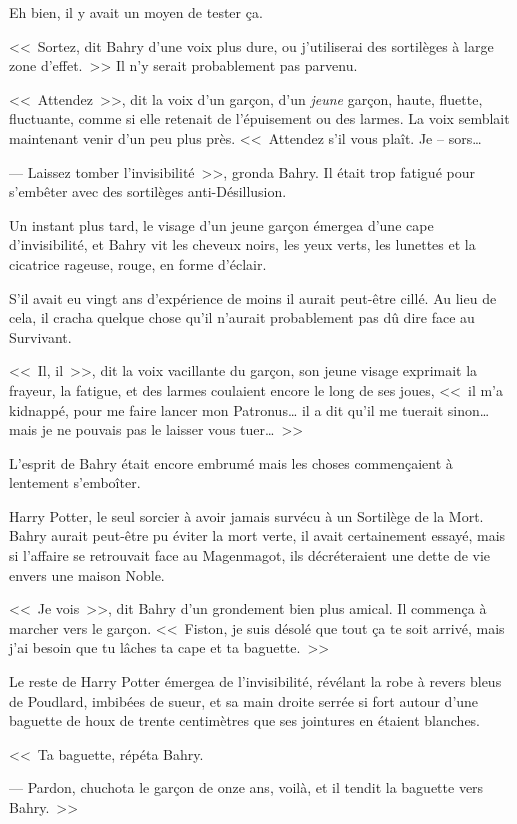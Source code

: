 Eh bien, il y avait un moyen de tester ça.

<<~Sortez, dit Bahry d'une voix plus dure, ou j'utiliserai des sortilèges à large zone d'effet.~>> Il n'y serait probablement pas parvenu.

<<~Attendez~>>, dit la voix d'un garçon, d'un \emph{jeune} garçon, haute, fluette, fluctuante, comme si elle retenait de l'épuisement ou des larmes. La voix semblait maintenant venir d'un peu plus près. <<~Attendez s'il vous plaît. Je -- sors…

--- Laissez tomber l'invisibilité~>>, gronda Bahry. Il était trop fatigué pour s'embêter avec des sortilèges anti-Désillusion.

Un instant plus tard, le visage d'un jeune garçon émergea d'une cape d'invisibilité, et Bahry vit les cheveux noirs, les yeux verts, les lunettes et la cicatrice rageuse, rouge, en forme d'éclair.

S'il avait eu vingt ans d'expérience de moins il aurait peut-être cillé. Au lieu de cela, il cracha quelque chose qu'il n'aurait probablement pas dû dire face au Survivant.

<<~Il, il~>>, dit la voix vacillante du garçon, son jeune visage exprimait la frayeur, la fatigue, et des larmes coulaient encore le long de ses joues, <<~il m'a kidnappé, pour me faire lancer mon Patronus… il a dit qu'il me tuerait sinon… mais je ne pouvais pas le laisser vous tuer…~>>

L'esprit de Bahry était encore embrumé mais les choses commençaient à lentement s'emboîter.

Harry Potter, le seul sorcier à avoir jamais survécu à un Sortilège de la Mort. Bahry aurait peut-être pu éviter la mort verte, il avait certainement essayé, mais si l'affaire se retrouvait face au Magenmagot, ils décréteraient une dette de vie envers une maison Noble.

<<~Je vois~>>, dit Bahry d'un grondement bien plus amical. Il commença à marcher vers le garçon. <<~Fiston, je suis désolé que tout ça te soit arrivé, mais j'ai besoin que tu lâches ta cape et ta baguette.~>>

Le reste de Harry Potter émergea de l'invisibilité, révélant la robe à revers bleus de Poudlard, imbibées de sueur, et sa main droite serrée si fort autour d'une baguette de houx de trente centimètres que ses jointures en étaient blanches.

<<~Ta baguette, répéta Bahry.

--- Pardon, chuchota le garçon de onze ans, voilà, et il tendit la baguette vers Bahry.~>>

